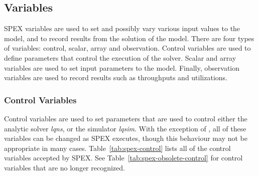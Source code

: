 \subsection{Variables}
\label{sec:spex-variables}

SPEX variables are used to set and possibly vary various input values to the model, and to record results
from the solution of the model.  There are four types of variables:
control, scalar, array and observation.  Control variables are used to define parameters that control the
execution of the solver.  Scalar and array variables are used to set input parameters to the model.
Finally, observation variables are used to record results such as throughputs and utilizations.

\subsubsection{Control Variables}
\label{sec:spex-control}

Control variables are used to set parameters that are used to control either the analytic solver
\emph{lqns}, or the simulator \emph{lqsim}.  With the exception of , all of these
variables can be changed as SPEX executes, though this behaviour may not be appropriate in many cases.
Table~\ref{tab:spex-control} lists all of the control variables accepted by SPEX.  See Table~\ref{tab:spex-obsolete-control} for 
control variables that are no longer recognized.


